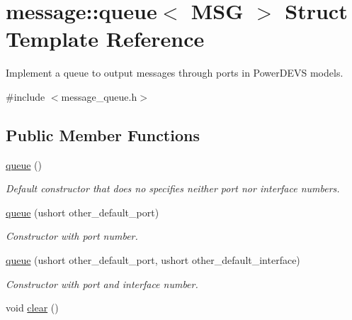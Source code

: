 \hypertarget{classmessage_1_1queue}{}\section{message\+:\+:queue$<$ M\+SG $>$ Struct Template Reference}
\label{classmessage_1_1queue}


Implement a queue to output messages through ports in Power\+D\+E\+VS models.  




{\ttfamily \#include $<$message\+\_\+queue.\+h$>$}

\subsection*{Public Member Functions}
\begin{DoxyCompactItemize}
\item 
\hyperlink{classmessage_1_1queue_ac166e11137e5addc2f81b672c9b55c4d}{queue} ()
\begin{DoxyCompactList}\small\item\em Default constructor that does no specifies neither port nor interface numbers. \end{DoxyCompactList}\item 
\hyperlink{classmessage_1_1queue_a6d303f8450ddfc4f1cffd80e94e25f0a}{queue} (ushort other\+\_\+default\+\_\+port)
\begin{DoxyCompactList}\small\item\em Constructor with port number. \end{DoxyCompactList}\item 
\hyperlink{classmessage_1_1queue_a34787cab8e5205524bbebe4343033c62}{queue} (ushort other\+\_\+default\+\_\+port, ushort other\+\_\+default\+\_\+interface)
\begin{DoxyCompactList}\small\item\em Constructor with port and interface number. \end{DoxyCompactList}\item 
void \hyperlink{classmessage_1_1queue_a6b5fbac4cdd0c3a563e3d8f8422e2cb1}{clear} ()\hypertarget{classmessage_1_1queue_a6b5fbac4cdd0c3a563e3d8f8422e2cb1}{}\label{classmessage_1_1queue_a6b5fbac4cdd0c3a563e3d8f8422e2cb1}


\end{DoxyCompactItemize}
